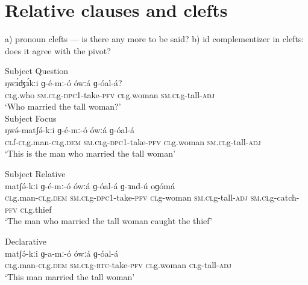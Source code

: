 \chapter{Relative clauses and clefts}\label{chapter:relative}




a) pronoun clefts --- is there any more to be said?
b) id complementizer in clefts: does it agree with the pivot?


\ea
\ea	  Subject Question \\
\gll 	ŋwɜ́ʤɜ́kːi	ɡ-é-mː-ó	ówːá	ɡ-óal-á?\\
		\textsc{cl}g.who	\textsc{sm.cl}g-\textsc{dpc1}-take-\textsc{pfv}	\textsc{cl}g.woman	\textsc{sm.cl}g-tall-\textsc{adj}\\
\trans	‘Who married the tall woman?’\\
\ex	Subject Focus\\
\gll	ŋwə́-matʃə́-kːi	ɡ-é-mː-ó	ówːá	ɡ-óal-á  \\
	\textsc{cl}f-\textsc{cl}g.man-\textsc{cl}g.\textsc{dem}	\textsc{sm.cl}g-\textsc{dpc1}-take-\textsc{pfv}	\textsc{cl}g.woman	\textsc{sm.cl}g-tall-\textsc{adj}\\    
\trans		‘This is the man who married the tall woman’\\
\z
\z

\ea	 	Subject Relative\\
\gll	matʃə́-kːi	ɡ-é-mː-ó	ówːá	ɡ-óal-á  	ɡ-ɜnd-ú	oɡómá\\       
	\textsc{cl}g.man-\textsc{cl}g.\textsc{dem}	\textsc{sm.cl}g-\textsc{dpc1}-take-\textsc{pfv}	\textsc{cl}g-woman	\textsc{\textsc{sm.cl}}g-tall-\textsc{adj}    
	\textsc{sm.cl}g-catch-\textsc{pfv}	\textsc{cl}g.thief\\
\trans	‘The man who married the tall woman caught the thief’\\
\z

\ea	Declarative\\
\gll	matʃə́-kːi	ɡ-a-mː-ó	ówːá	ɡ-óal-á  \\
	\textsc{cl}g.man-\textsc{cl}g.\textsc{dem}	\textsc{sm.cl}g-\textsc{rtc}-take-\textsc{pfv}	\textsc{cl}g.woman	\textsc{cl}g-tall-\textsc{adj}\\
\trans	‘This man married the tall woman’\\
\z

